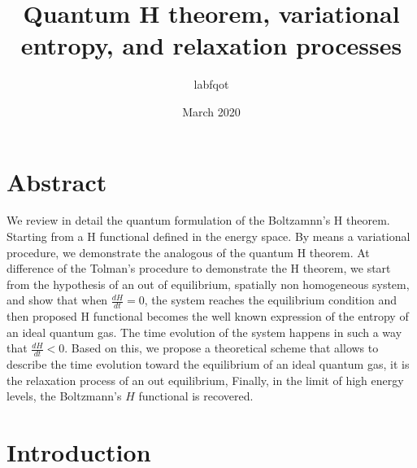 \documentclass{article}
\title{Quantum H theorem, variational entropy, and relaxation processes}
\author{labfqot}
\date{March 2020}
\begin{document}
\maketitle

\section{Abstract}
We review in detail the quantum formulation of the Boltzamnn's H theorem. Starting from a H functional defined in the energy space. By means a variational procedure, we demonstrate the analogous of the quantum H theorem. At difference of the Tolman's procedure to demonstrate the H theorem,  we start from the hypothesis of an out of equilibrium, spatially non homogeneous system, and show that when $\frac{dH}{dt}=0$, the system reaches the equilibrium condition and then proposed H functional becomes the well known expression of the entropy of an ideal quantum gas. The time evolution of the system happens in such a way that $\frac{dH}{dt}<0$. Based on this, we propose a theoretical scheme that allows to describe the time evolution toward the equilibrium of an ideal quantum gas, it is the relaxation process of an out equilibrium, Finally, in the limit of high energy levels, the Boltzmann's $H$ functional is recovered.







\section{Introduction}
\end{document}
